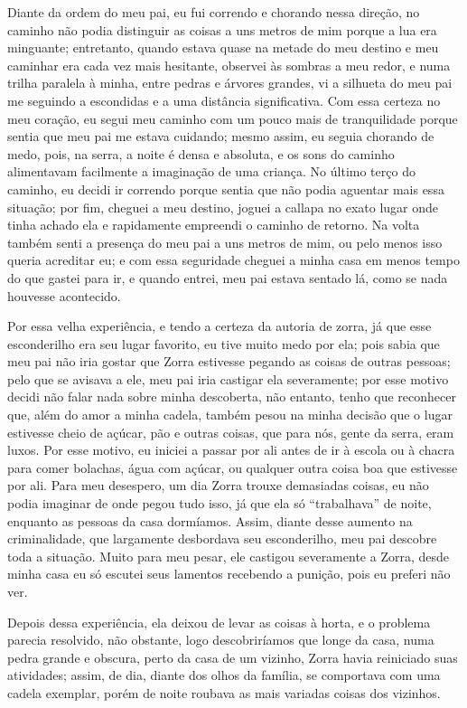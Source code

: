 Diante da ordem do meu pai, eu fui correndo e chorando nessa direção, no caminho não podia distinguir as coisas a uns metros de mim porque a lua era minguante; entretanto, quando estava quase na metade do meu destino e meu caminhar era cada vez mais hesitante, observei às sombras a meu redor, e numa trilha paralela à minha, entre pedras e árvores grandes, vi a silhueta do meu pai me seguindo a escondidas e a uma distância significativa.
Com essa certeza no meu coração, eu segui meu caminho com um pouco mais de tranquilidade porque sentia que meu pai me estava cuidando; mesmo assim, eu seguia chorando de medo, pois, na serra, a noite é densa e absoluta, e os sons do caminho alimentavam facilmente a imaginação de uma criança.
No último terço do caminho, eu decidi ir correndo porque sentia que não podia aguentar mais essa situação; por fim, cheguei a meu destino, joguei a callapa no exato lugar onde tinha achado ela e rapidamente empreendi o caminho de retorno.
Na volta também senti a presença do meu pai a uns metros de mim, ou pelo menos isso queria acreditar eu; e com essa seguridade cheguei a minha casa em menos tempo do que gastei para ir, e quando entrei, meu pai estava sentado lá, como se nada houvesse acontecido.


Por essa velha experiência, e tendo a certeza da autoria de zorra, já que esse esconderilho era seu lugar favorito, eu tive muito medo por ela; pois sabia que meu pai não iria gostar que Zorra estivesse pegando as coisas de outras pessoas; pelo que se avisava a ele, meu pai iria castigar ela severamente; por esse motivo decidi não falar nada sobre minha descoberta, não entanto, tenho que reconhecer que, além do amor a minha cadela, também pesou na minha decisão que o lugar estivesse cheio de açúcar, pão e outras coisas, que para nós, gente da serra, eram luxos. 
Por esse motivo, eu iniciei a passar por ali antes de ir à escola ou à chacra para comer bolachas, água com açúcar, ou qualquer outra coisa boa que estivesse por ali. 
Para meu desespero, um dia Zorra trouxe demasiadas coisas, eu  não podia imaginar de onde pegou tudo isso, já que ela só ``trabalhava'' de noite, enquanto as pessoas da casa dormíamos. Assim, diante desse aumento na criminalidade, que largamente desbordava seu esconderilho, meu pai descobre toda a situação.
Muito para meu pesar, ele castigou severamente a Zorra, desde minha casa eu só escutei seus lamentos recebendo a punição, pois eu preferi não ver.

Depois dessa experiência, ela deixou de  levar as coisas à horta, e o problema parecia resolvido, não obstante, logo descobriríamos que longe da casa, numa pedra grande e obscura, perto da casa de um vizinho, Zorra havia reiniciado suas atividades; assim, de dia, diante dos olhos da família, se comportava com uma cadela exemplar, porém de noite roubava as mais variadas coisas dos vizinhos.

